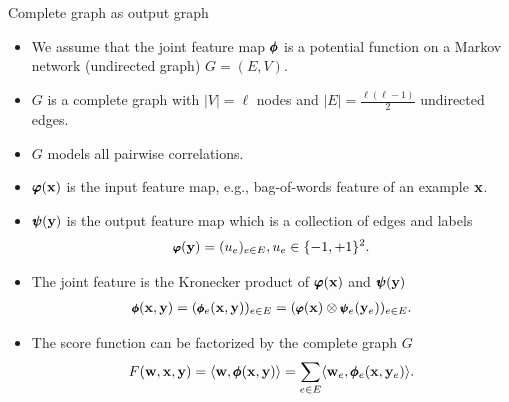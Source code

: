 \documentclass[first=dgreen,second=purple,logo=yellowexc]{aaltoslides}
\begin{document}
%
\begin{frame}{Complete graph as output graph}
	\begin{itemize}\footnotesize
		\item We assume that the joint feature map $\pmb \phi$ is a potential function on a Markov network (undirected graph) $G=(E,V)$.
		\item $G$ is a complete graph with $|V| = \ell$ nodes and $|E| = \frac{\ell(\ell-1)}{2}$ undirected edges.
		\item $G$ models all pairwise correlations.
		\item $\pmb \varphi(\mathbf {x})$ is the input feature map, e.g., bag-of-words feature of an example $\mathbf {x}$.
		\item $\pmb \psi(\mathbf {y})$ is the output feature map which is a collection of edges and labels
		\begin{align*}\footnotesize
			\pmb \varphi(\mathbf {y}) = (u_{e})_{e\in E},u_e\in\{-1,+1\}^2.
		\end{align*}
		\item The joint feature is the Kronecker product of $\pmb \varphi(\mathbf {x})$ and $\pmb \psi(\mathbf {y})$
		\begin{align*}\footnotesize
			\pmb \phi(\mathbf {x},\mathbf {y}) = (\pmb \phi_e(\mathbf {x},\mathbf {y}))_{e\in E}=(\pmb \varphi(\mathbf {x})\otimes\pmb \psi_e(\mathbf {y}_e))_{e\in E}.
		\end{align*}
		\item The score function can be factorized by the complete graph $G$
		\begin{align*}
			F(\mathbf {w},\mathbf {x},\mathbf {y}) = \langle \mathbf {w}, \pmb \phi(\mathbf {x},\mathbf {y}) \rangle = \sum_{e\in E}\langle \mathbf {w}_e, \pmb \phi_e(\mathbf {x},\mathbf {y}_e) \rangle.
		\end{align*}
	\end{itemize}
\end{frame}
\end{document}
